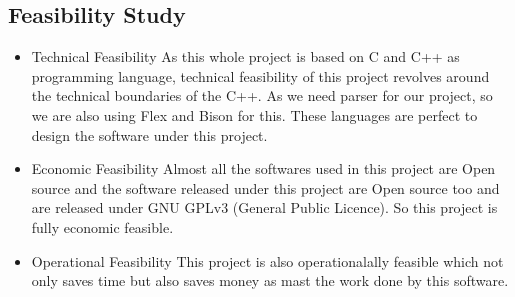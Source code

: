 \subsection{Feasibility Study}
\begin{itemize}
\item Technical Feasibility As this whole project is based on C and C++ as programming language, technical feasibility of this project revolves around the technical boundaries of the C++. As we need parser for our project, so we are also using Flex and Bison for this.
These languages are perfect to design the software under this project.\\
\item Economic Feasibility Almost all the softwares used in this project are Open source and the software released under this project are Open source too and are released under GNU GPLv3 (General Public Licence). So this project is fully economic feasible.\\
\item Operational Feasibility This project is also operationalally feasible which not only saves time but also saves money as mast the work done by this software.
\end{itemize}

